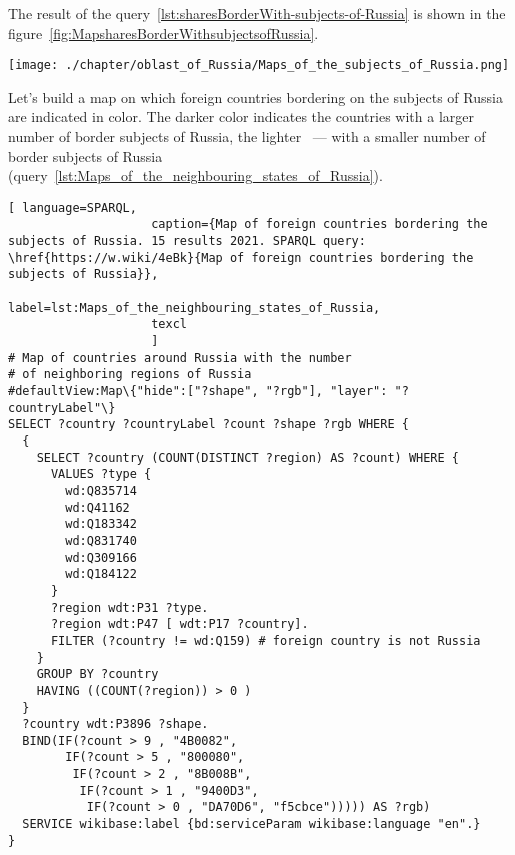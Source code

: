 The result of the query~\protect\ref{lst:sharesBorderWith-subjects-of-Russia} is shown in the figure~\ref{fig:MapsharesBorderWithsubjectsofRussia}.

\begin{figure*}[h]
	\texttt{[image: ./chapter/oblast\_of\_Russia/Maps\_of\_the\_subjects\_of\_Russia.png]}
	\caption[Map of the subjects of Russia bordering on foreign countries, 2021.]{Map of the subjects of Russia bordering on foreign countries, 2021. The map is based on the data received by the request~\protect\ref{lst:sharesBorderWith-subjects-of-Russia}.}%
      \label{fig:MapsharesBorderWithsubjectsofRussia}%
\end{figure*}

Let's build a map on which foreign countries bordering on the subjects of Russia are indicated in color. The darker color indicates the countries with a larger number of border subjects of Russia, the lighter ~--- with a smaller number of border subjects of Russia (query~\protect\ref{lst:Maps_of_the_neighbouring_states_of_Russia}).

\lstset{numbers=left, firstnumber=1, frame=single}
\begin{lstlisting}[ language=SPARQL, 
                    caption={Map of foreign countries bordering the subjects of Russia. 15 results 2021. SPARQL query: \href{https://w.wiki/4eBk}{Map of foreign countries bordering the subjects of Russia}},
                    label=lst:Maps_of_the_neighbouring_states_of_Russia,
                    texcl 
                    ]
# Map of countries around Russia with the number 
# of neighboring regions of Russia
#defaultView:Map\{"hide":["?shape", "?rgb"], "layer": "?countryLabel"\}
SELECT ?country ?countryLabel ?count ?shape ?rgb WHERE {
  {
    SELECT ?country (COUNT(DISTINCT ?region) AS ?count) WHERE {
      VALUES ?type {
        wd:Q835714
        wd:Q41162
        wd:Q183342
        wd:Q831740
        wd:Q309166
        wd:Q184122
      }
      ?region wdt:P31 ?type.
      ?region wdt:P47 [ wdt:P17 ?country].
      FILTER (?country != wd:Q159) # foreign country is not Russia
    }
    GROUP BY ?country
    HAVING ((COUNT(?region)) > 0 )
  }
  ?country wdt:P3896 ?shape.
  BIND(IF(?count > 9 , "4B0082", 
        IF(?count > 5 , "800080", 
         IF(?count > 2 , "8B008B", 
          IF(?count > 1 , "9400D3", 
           IF(?count > 0 , "DA70D6", "f5cbce"))))) AS ?rgb)
  SERVICE wikibase:label {bd:serviceParam wikibase:language "en".}
}
\end{lstlisting}%

